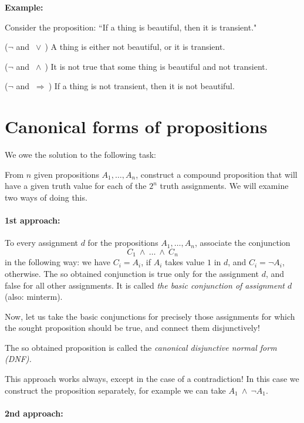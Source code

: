\documentclass[11pt,paper=b5,footinclude,headinclude]{scrbook} %
\def\ali {{~\vee~}}
\def\inn {{~\wedge~}}
\def\sledi {{~\Rightarrow~}}
\theoremstyle{remark}
\theoremstyle{definition} %
\theoremstyle{theorem} %
\begin{document}
\medskip
\textbf{ Example:}

Consider the proposition: ``If a thing is beautiful, then it is transient."

($\neg$ and $\ali$) A thing is either not beautiful, or it is transient.

($\neg$ and $\inn$) It is not true that some thing is beautiful and not transient.

($\neg$ and $\sledi$) If a thing is not transient, then it is not beautiful.



\section{Canonical forms of propositions}

We owe the solution to the following task:

From $n$ given propositions $A_1,\ldots, A_n$, construct a compound proposition that will have a
 given truth value for each of the  $2^n$ truth assignments.
We will examine two ways of doing this.

\bigskip

\paragraph{1st approach:}
To every assignment $d$ for the propositions $A_1,\ldots, A_n$, associate the conjunction
$$C_1\inn \ldots \inn C_n$$
in the following way:
we have $C_i = A_i$, if $A_i$ takes value $1$ in $d$, and
$C_i = \neg A_i$, otherwise.
The so obtained conjunction is true only for the assignment $d$, and false for all other assignments.
It is called {\em the basic conjunction of assignment $d$} (also: minterm).

Now, let us take the basic conjunctions for precisely those assignments for which the sought proposition should be true, and
connect them disjunctively!

The so obtained proposition is called the {\em canonical disjunctive normal form (DNF).}

This approach works always, except in the case of a contradiction!
In this case we construct the proposition separately, for example
we can take $A_1\inn \neg A_1$.

\paragraph{2nd approach:}
\end{document}
